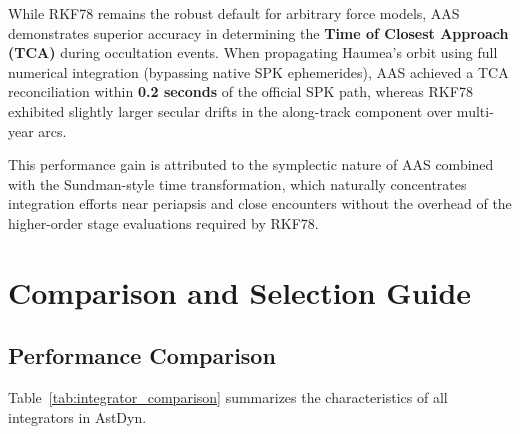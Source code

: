 While RKF78 remains the robust default for arbitrary force models, AAS demonstrates superior accuracy in determining the \textbf{Time of Closest Approach (TCA)} during occultation events. When propagating Haumea's orbit using full numerical integration (bypassing native SPK ephemerides), AAS achieved a TCA reconciliation within \textbf{0.2 seconds} of the official SPK path, whereas RKF78 exhibited slightly larger secular drifts in the along-track component over multi-year arcs.

This performance gain is attributed to the symplectic nature of AAS combined with the Sundman-style time transformation, which naturally concentrates integration efforts near periapsis and close encounters without the overhead of the higher-order stage evaluations required by RKF78.

\section{Comparison and Selection Guide}

\subsection{Performance Comparison}

Table~\ref{tab:integrator_comparison} summarizes the characteristics of all integrators in AstDyn.

\begin{table}[htbp]
\centering
{}
\caption{Comparison of numerical integrators in AstDyn.}
\label{tab:integrator_comparison}
\end{table}

